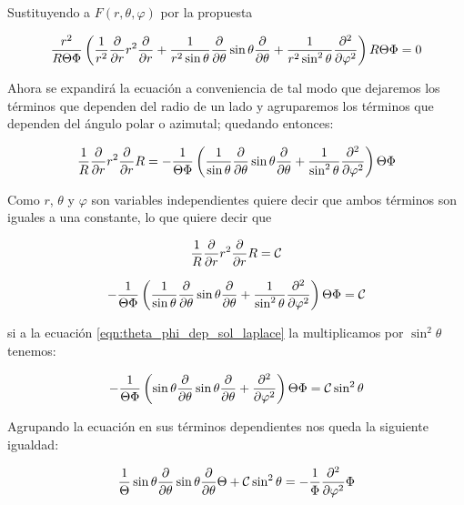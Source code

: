 \documentclass[11pt]{report}
\theoremstyle{plain}
\theoremstyle{definition}
\begin{document}
Sustituyendo a $F(r,\theta,\varphi)$ por la propuesta


\begin{equation*} %
	\frac{r^2}{R\Theta\Phi} \left(\frac{1}{r^2}\pdv{r}r^2\pdv{r} + \frac{1}{r^2\sin\theta}\pdv{\theta}\sin\theta\pdv{\theta} + \frac{1}{r^2\sin^2\theta}\pdv[2]{\varphi}\right)R\Theta\Phi= 0
\end{equation*}

Ahora se expandirá la ecuación a conveniencia de tal modo que dejaremos los términos que dependen del radio de un lado y agruparemos los términos que dependen del ángulo polar o azimutal; quedando entonces:


\begin{equation*}%
	\frac{1}{R}\pdv{r}r^2\pdv{r}R = -\frac{1}{\Theta\Phi}\left(\frac{1}{\sin\theta}\pdv{\theta}\sin\theta\pdv{\theta} + \frac{1}{\sin^2\theta}\pdv[2]{\varphi}\right)\Theta\Phi
\end{equation*}

Como $r$, $\theta$ y $\varphi$ son variables independientes quiere decir que ambos términos son iguales a una constante, lo que quiere decir que

\begin{equation}
\label{eqn:r_dep_sol_laplace} %
	\frac{1}{R}\pdv{r}r^2\pdv{r}R = \mathcal{C}
\end{equation}

\begin{equation}
\label{eqn:theta_phi_dep_sol_laplace} %
	-\frac{1}{\Theta\Phi}\left(\frac{1}{\sin\theta}\pdv{\theta}\sin\theta\pdv{\theta} + \frac{1}{\sin^2\theta}\pdv[2]{\varphi}\right)\Theta\Phi = \mathcal{C}
\end{equation}


si a la ecuación \ref{eqn:theta_phi_dep_sol_laplace} la multiplicamos por $\sin^2\theta$ tenemos:

\begin{equation*} %
	-\frac{1}{\Theta\Phi}\left(\sin\theta\pdv{\theta}\sin\theta\pdv{\theta} + \pdv[2]{\varphi}\right)\Theta\Phi = \mathcal{C}\sin^2\theta
\end{equation*}

Agrupando la ecuación en sus términos dependientes nos queda la siguiente igualdad:

\begin{equation*} %
	\frac{1}{\Theta}\sin\theta\pdv{\theta}\sin\theta	\pdv{\theta}\Theta+\mathcal{C}\sin^2\theta = - \frac{1}{\Phi}\pdv[2]{\varphi}\Phi 
\end{equation*}
\end{document}
